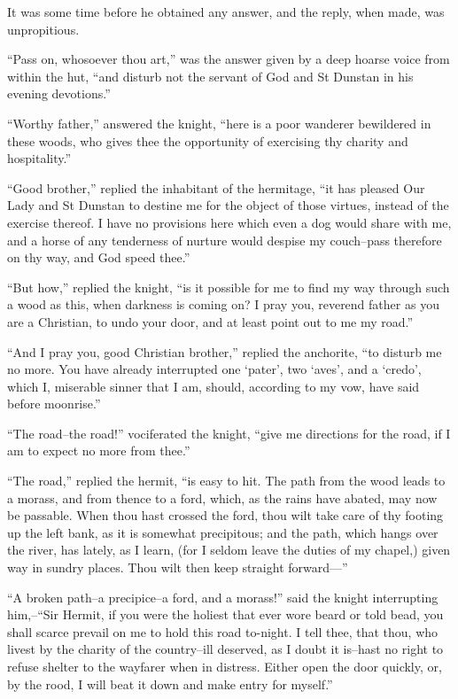 It was some time before he obtained any answer, and the reply, when
made, was unpropitious.

``Pass on, whosoever thou art,'' was the answer given by a deep hoarse
voice from within the hut, ``and disturb not the servant of God and St
Dunstan in his evening devotions.''

``Worthy father,'' answered the knight, ``here is a poor wanderer
bewildered in these woods, who gives thee the opportunity of exercising
thy charity and hospitality.''

``Good brother,'' replied the inhabitant of the hermitage, ``it has
pleased Our Lady and St Dunstan to destine me for the object of those
virtues, instead of the exercise thereof. I have no provisions here
which even a dog would share with me, and a horse of any tenderness of
nurture would despise my couch--pass therefore on thy way, and God speed
thee.''

``But how,'' replied the knight, ``is it possible for me to find my way
through such a wood as this, when darkness is coming on? I pray you,
reverend father as you are a Christian, to undo your door, and at least
point out to me my road.''

``And I pray you, good Christian brother,'' replied the anchorite, ``to
disturb me no more. You have already interrupted one `pater', two
`aves', and a `credo', which I, miserable sinner that I am, should,
according to my vow, have said before moonrise.''

``The road--the road!'' vociferated the knight, ``give me directions for
the road, if I am to expect no more from thee.''

``The road,'' replied the hermit, ``is easy to hit. The path from the
wood leads to a morass, and from thence to a ford, which, as the rains
have abated, may now be passable. When thou hast crossed the ford, thou
wilt take care of thy footing up the left bank, as it is somewhat
precipitous; and the path, which hangs over the river, has lately, as I
learn, (for I seldom leave the duties of my chapel,) given way in sundry
places. Thou wilt then keep straight forward---''

``A broken path--a precipice--a ford, and a morass!'' said the knight
interrupting him,--``Sir Hermit, if you were the holiest that ever wore
beard or told bead, you shall scarce prevail on me to hold this road
to-night. I tell thee, that thou, who livest by the charity of the
country--ill deserved, as I doubt it is--hast no right to refuse shelter
to the wayfarer when in distress. Either open the door quickly, or, by
the rood, I will beat it down and make entry for myself.''

